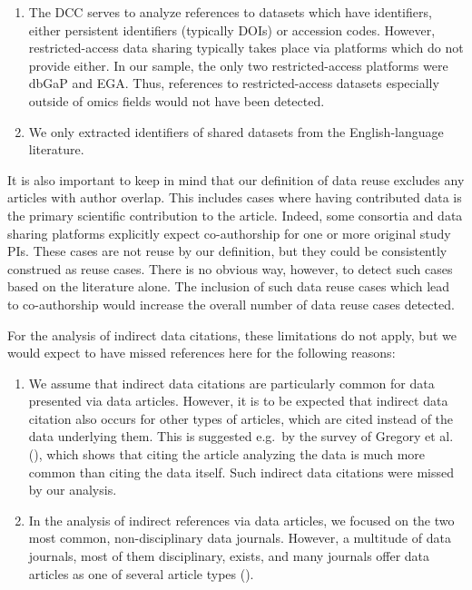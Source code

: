 \documentclass[
  letterpaper,
  DIV=11,
  numbers=noendperiod]{scrartcl}
\begin{document}
\begin{enumerate}
  articles which cited the data article sometimes additionally
  referenced the dataset itself by its identifier. Where the data
  article text itself was the point of reference, and no indirect data
  citation occurred, such cases would have constituted additional
  dataset references. We did not extract these cases, however, and thus
  they are missing from the overall number of dataset references, as
  detected in the DCC analysis.
\item
  The DCC serves to analyze references to datasets which have
  identifiers, either persistent identifiers (typically DOIs) or
  accession codes. However, restricted-access data sharing typically
  takes place via platforms which do not provide either. In our sample,
  the only two restricted-access platforms were dbGaP and EGA. Thus,
  references to restricted-access datasets especially outside of omics
  fields would not have been detected.
\item
  We only extracted identifiers of shared datasets from the
  English-language literature.
\end{enumerate}

It is also important to keep in mind that our definition of data reuse
excludes any articles with author overlap. This includes cases where
having contributed data is the primary scientific contribution to the
article. Indeed, some consortia and data sharing platforms explicitly
expect co-authorship for one or more original study PIs. These cases are
not reuse by our definition, but they could be consistently construed as
reuse cases. There is no obvious way, however, to detect such cases
based on the literature alone. The inclusion of such data reuse cases
which lead to co-authorship would increase the overall number of data
reuse cases detected.

For the analysis of indirect data citations, these limitations do not
apply, but we would expect to have missed references here for the
following reasons:

\begin{enumerate}
\def\labelenumi{(\arabic{enumi})}
\item
  We assume that indirect data citations are particularly common for
  data presented via data articles. However, it is to be expected that
  indirect data citation also occurs for other types of articles, which
  are cited instead of the data underlying them. This is suggested
  e.g.~by the survey of Gregory et al.
  (), which shows that citing the
  article analyzing the data is much more common than citing the data
  itself. Such indirect data citations were missed by our analysis.
\item
  In the analysis of indirect references via data articles, we focused
  on the two most common, non-disciplinary data journals. However, a
  multitude of data journals, most of them disciplinary, exists, and
  many journals offer data articles as one of several article types
  ().
\end{enumerate}
\end{document}
